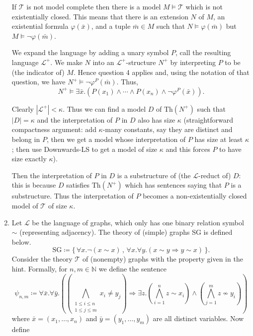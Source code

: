 \documentclass{article}
\begin{document}
\begin{enumerate}[leftmargin=*]
		If $\mathcal{T}$ is not model complete then there is a model $M \models \mathcal{T}$ which is not existentially closed. This means that there is an extension $N$ of $M$, an existential formula $\varphi(\bar{x})$, and a tuple $\bar{m}\in M$ such that $N\models \varphi(\bar{m})$ but $M\models \neg \varphi(\bar{m})$.
		
		We expand the language by adding a unary symbol $P$, call the resulting language $\mathcal{L}^+$. We make $N$ into an $\mathcal{L}^+$-structure $N^+$ by interpreting $P$ to be (the indicator of) $M$. Hence question 4 applies and, using the notation of that question, we have $N^+\models \neg\varphi^P(\bar{m})$.  Thus,
		\[
			N^+ \models \exists \bar{x}. (P(x_1)\wedge \cdots \wedge P(x_n) \wedge \neg\varphi^P(\bar{x})).
		\]
		
		Clearly $|\mathcal{L}^+| < \kappa$. Thus we can find a model $D$ of $\text{Th}(N^+)$ such that $|D|= \kappa$ and the interpretation of $P$ in $D$ also has size $\kappa$ (straightforward compactness argument: add $\kappa$-many constants, say they are distinct and belong in $P$, then we get a model whose interpretation of $P$ has size at least $\kappa$; then use Downwards-LS to get a model of size $\kappa$ and this forces $P$ to have size exactly $\kappa$).
		
		Then the interpretation of $P$ in $D$ is a substructure of (the $\mathcal{L}$-reduct of) $D$: this is because $D$ satisfies $\text{Th}(N^+)$ which has sentences saying that $P$ is a substructure. Thus the interpretation of $P$ becomes a non-existentially closed model of $\mathcal{T}$ of size $\kappa$.
		
		\item Let $\mathcal{L}$ be the language of graphs, which only has one binary relation symbol $\sim$ (representing adjacency). The theory of (simple) graphs SG is defined below.
		\[
			\text{SG}\coloneqq \{\,\forall x. \neg(x\sim x) \,,\, \forall x.\forall y. (x\sim y \Rightarrow y\sim x)\,\}.
		\]
		Consider the theory $\mathcal{T}$ of (nonempty) graphs with the property given in the hint. Formally, for $n,m\in\mathbb{N}$ we define the sentence
		\[
			\psi_{n,m} \coloneqq \forall \bar{x}.\forall\bar{y}.\left(\left( \bigwedge_{\substack{1\leq i \leq n\\ 1\leq j\leq m}} x_i\neq y_j\right)  \Rightarrow  \exists z. \left(\bigwedge_{i = 1}^n z \sim x_i\right) \wedge \left(\bigwedge_{j = 1}^m z \nsim y_i\right)\right)
		\]
		where $\bar{x} = (x_1,\ldots,x_n)$ and $\bar{y} = (y_1,\ldots,y_m)$ are all distinct variables. Now define 
		

\end{enumerate}
\end{document}
